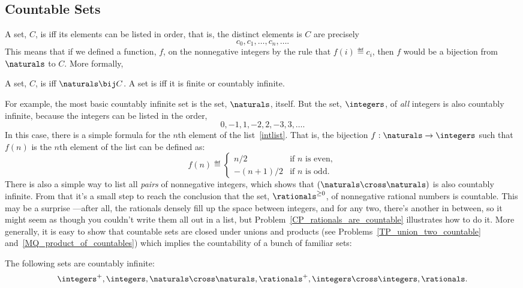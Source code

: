 \subsection{Countable Sets}
A set, $C$, is  iff its elements can be listed in
order, that is, the distinct elements is $C$ are precisely
\[
c_0, c_1, \dots, c_n, \dots.
\]
This means that if we defined a function, $f$, on the nonnegative
integers by the rule that $f(i) \eqdef c_i$, then $f$ would be a
bijection from $\naturals$ to $C$.  More formally,

\begin{definition}
  A set, $C$, is  iff $\naturals \bij C$.  A
  set is  iff it is finite or countably infinite.
\end{definition}

For example, the most basic countably infinite set is the set,
$\naturals$, itself.  But the set, $\integers$, of \emph{all} integers
is also countably infinite, because the integers can be listed in the
order,
\begin{equation}\label{intlist}
0,-1,1,-2,2,-3,3,\dots.
\end{equation}
In this case, there is a simple formula for the $n$th element of the
list~\eqref{intlist}.  That is, the bijection $f:\naturals \to
\integers$ such that $f(n)$ is the $n$th element of the list can be
defined as:
\[
f(n) \eqdef \begin{cases} n/2 & \text{if $n$ is even},\\ -(n+1)/2 &
  \text{if $n$ is odd}.
           \end{cases} 
\]    
There is also a simple way to list all \emph{pairs} of nonnegative
integers, which shows that $(\naturals \cross \naturals)$ is also
countably infinite.  From that it's a small step to reach the
conclusion that the set, $\rationals^{\ge 0}$, of nonnegative rational
numbers is countable.  This may be a surprise ---after all, the
rationals densely fill up the space between integers, and for any two,
there's another in between, so it might seem as though you couldn't
write them all out in a list, but
Problem~\ref{CP_rationals_are_countable} illustrates how to do it.
More generally, it is easy to show that countable sets are closed
under unions and products (see Problems~\ref{TP_union_two_countable}
and~\ref{MQ_product_of_countables}) which implies the countability of
a bunch of familiar sets:
\begin{corollary}\label{countable_examples}
The following sets are countably infinite:
\[\integers^+, 
 \integers, \naturals \cross \naturals, \rationals^+, \integers \cross
 \integers, \rationals.
\]
\end{corollary}

